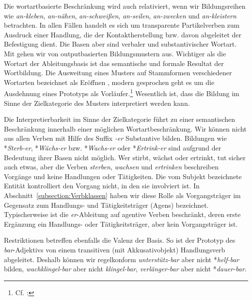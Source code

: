 Die wortartbasierte Beschränkung wird auch relativiert, wenn wir Bildungsreihen wie \textit{an-kleben}, \textit{an-nähen}, \textit{an-schweißen}, \textit{an-seilen}, \textit{an-zwecken} und \textit{an-kleistern} betrachten. In allen Fällen handelt es sich um transparente Partikelverben zum Ausdruck einer Handlung, die der Kontaktherstellung bzw. davon abgeleitet der Befestigung dient. Die Basen aber sind verbaler und substantivischer Wortart. Mit \citet[44--45]{Plank1981} gehen wir von outputbasierten Bildungsmustern aus. Wichtiger als die Wortart der Ableitungsbasis ist das semantische und formale Resultat der Wortbildung. Die Ausweitung eines Musters auf Stammformen verschiedener Wortarten bezeichnet \citet[14]{Wilmanns1896Wb} als Eröffnen , modern gesprochen geht es um die Ausdehnung eines Prototyps als Vorläufer.\footnote{Cf. \citet[295]{Langacker1991}: } Wesentlich ist, dass die Bildung im Sinne der Zielkategorie des Musters interpretiert werden kann.

Die Interpretierbarkeit im Sinne der Zielkategorie führt zu einer semantischen Beschränkung innerhalb einer möglichen Wortartbeschränkung. Wir können nicht aus allen Verben mit Hilfe des Suffix \textit{-er} Substantive bilden. Bildungen wie *\textit{Sterb-er}, *\textit{Wächs-er} bzw. *\textit{Wachs-er} oder *\textit{Ertrink-er} sind aufgrund der Bedeutung ihrer Basen nicht möglich. Wer stirbt, wächst oder ertrinkt, tut sicher auch etwas, aber die Verben \textit{sterben}, \textit{wachsen} und \textit{ertrinken} beschreiben Vorgänge und keine Handlungen oder Tätigkeiten. Die vom Subjekt bezeichnete Entität kontrolliert den Vorgang nicht, in den sie involviert ist. In Abschnitt~\ref{subsection:Verbklassen} haben wir diese Rolle als Vorgangsträger im Gegensatz zum Handlungs- und Tätigkeitsträger (Agens) bezeichnet. Typischerweise ist die \textit{er}-Ableitung auf agentive Verben beschränkt, deren erste Ergänzung ein Handlungs- oder Tätigkeitsträger, aber kein Vorgangsträger ist. 

Restriktionen betreffen ebenfalls die Valenz der Basis. So ist der Prototyp des \textit{bar}-Adjektivs von einem transitiven (mit Akkusativobjekt) Handlungsverb abgeleitet. Deshalb können wir regelkonform \textit{unterstütz-bar} aber nicht *\textit{helf-bar} bilden, \textit{wachklingel-bar} aber nicht \textit{klingel-bar}, \textit{verlänger-bar} aber nicht *\textit{dauer-bar}.     

